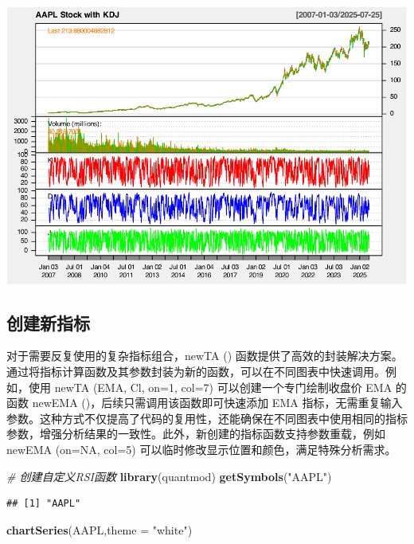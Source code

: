 \documentclass[]{ctexbook}
\newenvironment{Shaded}{\begin{snugshade}}{\end{snugshade}}
\newcommand{\AttributeTok}[1]{\textcolor[rgb]{0.13,0.29,0.53}{#1}}
\newcommand{\CommentTok}[1]{\textcolor[rgb]{0.56,0.35,0.01}{\textit{#1}}}
\newcommand{\FunctionTok}[1]{\textcolor[rgb]{0.13,0.29,0.53}{\textbf{#1}}}
\newcommand{\NormalTok}[1]{#1}
\newcommand{\StringTok}[1]{\textcolor[rgb]{0.31,0.60,0.02}{#1}}
\begin{document}
\includegraphics[width=0.9\linewidth]{QuantmodHandbook_files/figure-latex/defi-4}

\subsection{创建新指标}\label{ux521bux5efaux65b0ux6307ux6807}

对于需要反复使用的复杂指标组合，newTA () 函数提供了高效的封装解决方案。通过将指标计算函数及其参数封装为新的函数，可以在不同图表中快速调用。例如，使用 newTA (EMA, Cl, on=1, col=7) 可以创建一个专门绘制收盘价 EMA 的函数 newEMA ()，后续只需调用该函数即可快速添加 EMA 指标，无需重复输入参数。这种方式不仅提高了代码的复用性，还能确保在不同图表中使用相同的指标参数，增强分析结果的一致性。此外，新创建的指标函数支持参数重载，例如 newEMA (on=NA, col=5) 可以临时修改显示位置和颜色，满足特殊分析需求。

\begin{Shaded}
\begin{Highlighting}[]
\CommentTok{\# 创建自定义RSI函数}
\FunctionTok{library}\NormalTok{(quantmod)}
\FunctionTok{getSymbols}\NormalTok{(}\StringTok{"AAPL"}\NormalTok{)}
\end{Highlighting}
\end{Shaded}

\begin{verbatim}
## [1] "AAPL"
\end{verbatim}

\begin{Shaded}
\begin{Highlighting}[]
\FunctionTok{chartSeries}\NormalTok{(AAPL,}\AttributeTok{theme =} \StringTok{"white"}\NormalTok{)}
\end{Highlighting}
\end{Shaded}
\end{document}
